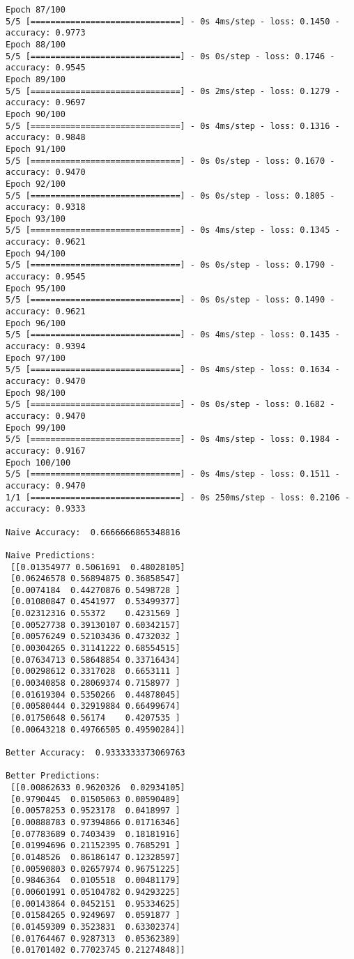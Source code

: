 \documentclass[12pt]{article}
\begin{document}
\begin{lstlisting}
Epoch 87/100
5/5 [==============================] - 0s 4ms/step - loss: 0.1450 - accuracy: 0.9773
Epoch 88/100
5/5 [==============================] - 0s 0s/step - loss: 0.1746 - accuracy: 0.9545
Epoch 89/100
5/5 [==============================] - 0s 2ms/step - loss: 0.1279 - accuracy: 0.9697
Epoch 90/100
5/5 [==============================] - 0s 4ms/step - loss: 0.1316 - accuracy: 0.9848
Epoch 91/100
5/5 [==============================] - 0s 0s/step - loss: 0.1670 - accuracy: 0.9470
Epoch 92/100
5/5 [==============================] - 0s 0s/step - loss: 0.1805 - accuracy: 0.9318
Epoch 93/100
5/5 [==============================] - 0s 4ms/step - loss: 0.1345 - accuracy: 0.9621
Epoch 94/100
5/5 [==============================] - 0s 0s/step - loss: 0.1790 - accuracy: 0.9545
Epoch 95/100
5/5 [==============================] - 0s 0s/step - loss: 0.1490 - accuracy: 0.9621
Epoch 96/100
5/5 [==============================] - 0s 4ms/step - loss: 0.1435 - accuracy: 0.9394
Epoch 97/100
5/5 [==============================] - 0s 4ms/step - loss: 0.1634 - accuracy: 0.9470
Epoch 98/100
5/5 [==============================] - 0s 0s/step - loss: 0.1682 - accuracy: 0.9470
Epoch 99/100
5/5 [==============================] - 0s 4ms/step - loss: 0.1984 - accuracy: 0.9167
Epoch 100/100
5/5 [==============================] - 0s 4ms/step - loss: 0.1511 - accuracy: 0.9470
1/1 [==============================] - 0s 250ms/step - loss: 0.2106 - accuracy: 0.9333

Naive Accuracy:  0.6666666865348816

Naive Predictions:
 [[0.01354977 0.5061691  0.48028105]
 [0.06246578 0.56894875 0.36858547]
 [0.0074184  0.44270876 0.5498728 ]
 [0.01080847 0.4541977  0.53499377]
 [0.02312316 0.55372    0.4231569 ]
 [0.00527738 0.39130107 0.60342157]
 [0.00576249 0.52103436 0.4732032 ]
 [0.00304265 0.31141222 0.68554515]
 [0.07634713 0.58648854 0.33716434]
 [0.00298612 0.3317028  0.6653111 ]
 [0.00340858 0.28069374 0.7158977 ]
 [0.01619304 0.5350266  0.44878045]
 [0.00580444 0.32919884 0.66499674]
 [0.01750648 0.56174    0.4207535 ]
 [0.00643218 0.49766505 0.49590284]]

Better Accuracy:  0.9333333373069763

Better Predictions:
 [[0.00862633 0.9620326  0.02934105]
 [0.9790445  0.01505063 0.00590489]
 [0.00578253 0.9523178  0.0418997 ]
 [0.00888783 0.97394866 0.01716346]
 [0.07783689 0.7403439  0.18181916]
 [0.01994696 0.21152395 0.7685291 ]
 [0.0148526  0.86186147 0.12328597]
 [0.00590803 0.02657974 0.96751225]
 [0.9846364  0.0105518  0.00481179]
 [0.00601991 0.05104782 0.94293225]
 [0.00143864 0.0452151  0.95334625]
 [0.01584265 0.9249697  0.0591877 ]
 [0.01459309 0.3523831  0.63302374]
 [0.01764467 0.9287313  0.05362389]
 [0.01701402 0.77023745 0.21274848]]

\end{lstlisting}
\end{document}
